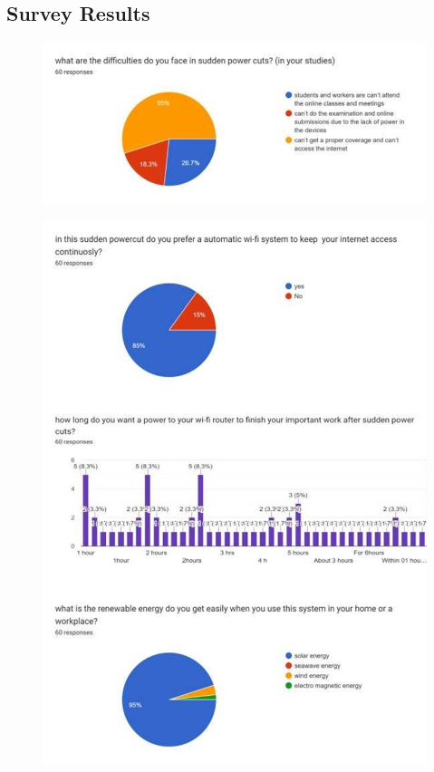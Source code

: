 \documentclass[twocolumn]{article}
\begin{document}
\begin{titlepage}
    \vspace{200pt}

    \section*{Survey Results}

    \begin{figure}[h]
        \centering
        \includegraphics{26.png}
        \label{fig:enter-label}
    \end{figure}
    
    \begin{figure}[h]
        \centering
        \includegraphics{27.png}
        \label{fig:enter-label}
    \end{figure}
    

\end{titlepage}
\end{document}
